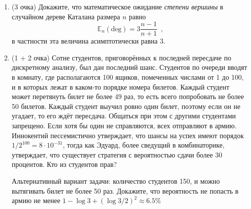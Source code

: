 \documentclass[a5paper]{article}
\theoremstyle{definition}
\begin{document}
\begin{enumerate}
(i) Найдите производящую функцию от трёх переменных для
полученного класса.

(ii) Найдите среднее количество слагаемых в разложении.
\item(3 очка) Докажите, что математическое ожидание \textit{степени вершины} в
случайном дереве Каталана размера \( n \) равно
\begin{equation}
    \mathbb E_n (\text{deg}) = 3 \dfrac{n-1}{n+1} \enspace ,
\end{equation}
в частности эта величина асимптотически равна \( 3 \).
\item(1 + 2 очка) Сотне студентов, приговорённых к последней пересдаче по дискретному анализу, был дан
последний шанс. Студентов по очереди вводят в комнату, где располагаются 100
ящиков, помеченных числами от 1 до 100, и в которых лежат в каком-то порядке
номера билетов. Каждый студент может перетянуть билет не более 49 раз, то есть
всего попробовать не более 50 билетов. Каждый студент выучил ровно один билет,
поэтому если он не угадает, то его ждёт пересдача.
Общаться при этом с другими студентами запрещено. Если хотя бы один не справляются, всех отправляют в армию.
Иннокентий пессемистично утверждает, что шансы на успех имеют порядок \(1 / 2^{100}
 = 8 \cdot 10^{-31}\), тогда как Эдуард, более сведущий в комбинаторике,
утверждает, что существует стратегия с вероятностью сдачи более 30 процентов.
Кто из студентов прав?

Альтернативный вариант задачи: количество студентов 150, и можно вытягивать
билет не более 50 раз. Докажите, что вероятность не попасть в армию не менее 
\( 1 - \log 3 + (\log 3/2)^2 \approx 6.5\%  \)
\end{enumerate}
\footnotesize


    
\end{document}
